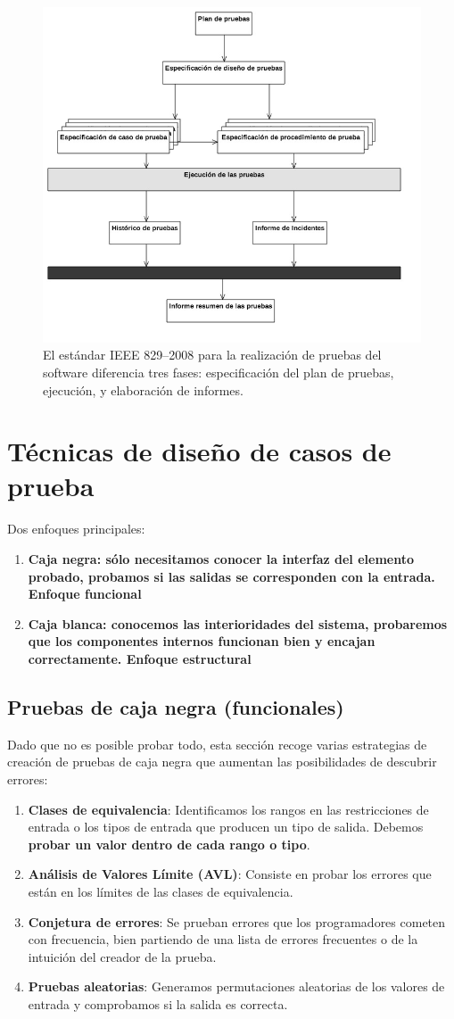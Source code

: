 \begin{figure}[H]
  \centering
  \includegraphics[width=0.6\linewidth]{Resources/IEEE829}
  \caption{El estándar IEEE 829--2008 para la realización de pruebas del software diferencia tres fases: especificación del plan de pruebas, ejecución, y elaboración de informes.}
  \label{fig:IEEE829}
\end{figure}

\section{Técnicas de diseño de casos de prueba}
Dos enfoques principales:
\begin{enumerate}
    \item \textbf{Caja negra: sólo necesitamos conocer la interfaz del elemento probado, probamos si las salidas se corresponden con la entrada. Enfoque funcional}
    \item \textbf{Caja blanca: conocemos las interioridades del sistema, probaremos que los componentes internos funcionan bien y encajan correctamente. Enfoque estructural}
\end{enumerate}
\subsection{Pruebas de caja negra (funcionales)} 

Dado que no es posible probar todo, esta sección recoge varias estrategias de creación de pruebas de caja negra que aumentan las posibilidades de descubrir errores:

\begin{enumerate}
    \item \textbf{Clases de equivalencia}: Identificamos los rangos en las restricciones de entrada o los tipos de entrada que producen un tipo de salida. Debemos \textbf{probar un valor dentro de cada rango o tipo}.
    \item \textbf{\textbf{A}nálisis de \textbf{V}alores \textbf{L}ímite (\textbf{AVL})}: Consiste en probar los errores que están en los límites de las clases de equivalencia.
    \item \textbf{Conjetura de errores}: Se prueban errores que los programadores cometen con frecuencia, bien partiendo de una lista de errores frecuentes o de la intuición del creador de la prueba.
    \item \textbf{Pruebas aleatorias}: Generamos permutaciones aleatorias de los valores de entrada y comprobamos si la salida es correcta.
\end{enumerate}

